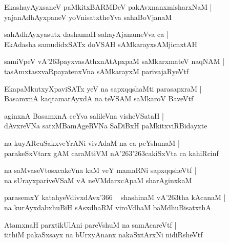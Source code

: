 \documentclass[twoside,12pt,openright]{book}
\def\S{\char'263}
\newcounter{shloka}[chapter]
\begin{document}
\begin{shloka}
EkashayAyxsaneV paMkitxBARMDeV pakAvxnanxmisharxNaM |\\
yajanAdhAyxpaneV yoVnisatxtheYva sahaBoVjanaM 
\end{shloka}

\begin{shloka}
sahAdhAyxyasutx dashamaH sahayAjanameVva ca |\\
EkAdasha samudidxSATx doVSAH sAMkarayxsAMjicnxtAH 
\end{shloka}

\begin{shloka}
samiVpeV vA\S payxvasAthxnAtApxpaM saMkarxmateV naqNAM |\\
tasAmxtasxvaRpayatenxVna sAMkarayxM parivajaRyeVtf 
\end{shloka}

\begin{shloka}
EkapaMkutxyXpaviSATx yeV na sapxqqshaMti parasapxraM |\\
BasamxnA kaqtamarAyxdA na teVSAM saMkaroV BaveVtf
\end{shloka}

\begin{shloka}
aginxnA BasamxnA ceYva salileVna visheVSataH |\\
dAvxreVNa satxMBamAgeRVNa SaDiBxH paMkitxviRBidayxte
\end{shloka}

\begin{shloka}
na kuyARcuSakxveYrANi vivAdaM na ca peYshunaM |\\
parakeSxVtarx gAM caraMtiVM nA\S \S cakiSxVta ca kahiRcinf 
\end{shloka}

\begin{shloka}
na saMvaseVtosxcakeVna kaM veY mamaRNi sapxqqsheVtf |\\
na sUrayxpariveVSaM vA neVMdarxcApaM sharAginxkaM 
\end{shloka}

\begin{shloka}
parasemxY katahyeVdivxdAvx\char'366 ~ shashinaM vA\S tha kAcanaM |\\
na kurAyxdabxhuBiH sAsxdhaRM  viroVdhaM baMdhuBisatxthA
\end{shloka}

\begin{shloka}
AtamxnaH parxtikUlAni pareVshuM na samAcareVtf |\\
tithiM pakaSxsayx na bUrxyAnanx nakaSxtArxNi nidiRsheVtf
\end{shloka}
\end{document}
